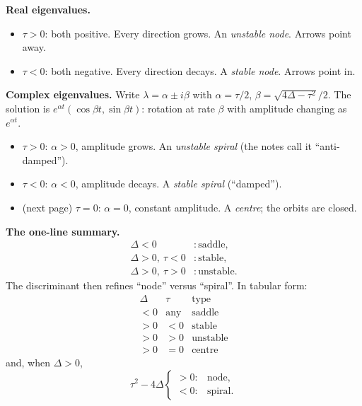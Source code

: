 \documentclass[10pt,a4paper]{article}
\begin{document}
{\textbf{Real eigenvalues.}
\begin{itemize}
\item[(i)] $\tau>0$: both positive. Every direction grows.
An \emph{unstable node}. Arrows point away.
\item[(ii)] $\tau<0$: both negative. Every direction decays.
A \emph{stable node}. Arrows point in.
\end{itemize}

\textbf{Complex eigenvalues.} Write
$\lambda=\alpha\pm i\beta$ with
$\alpha=\tau/2$, $\beta=\sqrt{4\Delta-\tau^2}/2$. The solution is
$e^{\alpha t}(\cos\beta t,\sin\beta t)$: rotation at rate $\beta$ with
amplitude changing as $e^{\alpha t}$.
\begin{itemize}
\item[(iii)] $\tau>0$: $\alpha>0$, amplitude grows. An
\emph{unstable spiral} (the notes call it ``anti-damped'').
\item[(iv)] $\tau<0$: $\alpha<0$, amplitude decays. A
\emph{stable spiral} (``damped'').
\item[(v)] (next page) $\tau=0$: $\alpha=0$, constant amplitude. A
\emph{centre}; the orbits are closed.
\end{itemize}

\textbf{The one-line summary.}
\[
\begin{aligned}
\Delta<0 &: \text{saddle},\\
\Delta>0,\ \tau<0 &: \text{stable},\\
\Delta>0,\ \tau>0 &: \text{unstable}.
\end{aligned}
\]
The discriminant then refines ``node'' versus ``spiral''. In tabular
form:
\[
\begin{array}{c|c|c}
\Delta & \tau & \text{type}\\ \hline
<0 & \text{any} & \text{saddle}\\
>0 & <0 & \text{stable}\\
>0 & >0 & \text{unstable}\\
>0 & =0 & \text{centre}
\end{array}
\]
and, when $\Delta>0$,
\[
\tau^2-4\Delta
\begin{cases}
>0: & \text{node},\\
<0: & \text{spiral}.
\end{cases}
\]
}
\end{document}
